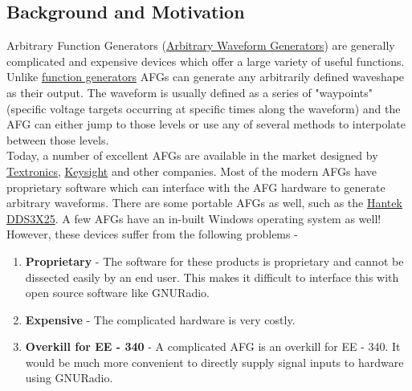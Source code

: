 \documentclass{article}
\begin{document}
\subsection{Background and Motivation}
Arbitrary Function Generators (\href{https://en.wikipedia.org/wiki/Arbitrary_waveform_generator}{Arbitrary Waveform Generators}) are generally complicated and expensive devices which offer a large variety of useful functions. Unlike \href{https://en.wikipedia.org/wiki/Function_generator}{function generators} AFGs can generate any arbitrarily defined waveshape as their output. The waveform is usually defined as a series of "waypoints" (specific voltage targets occurring at specific times along the waveform) and the AFG can either jump to those levels or use any of several methods to interpolate between those levels.
\\
Today, a number of excellent AFGs are available in the market designed by
\href{http://www.tek.com/arbitrary-function-generator}{Textronics}, \href{http://www.keysight.com/main/home.jspx?cc=IN&lc=eng}{Keysight} and other companies. Most of the modern AFGs have proprietary software which can interface with the AFG hardware to generate arbitrary waveforms. There are some portable AFGs as well, such as the \href{http://www.hantek.com/en/ProductDetail_12_24.html}{Hantek DDS3X25}. A few AFGs have an in-built Windows operating system as well!
\\However, these devices suffer from the following problems -
\begin{enumerate}
  \item \textbf{Proprietary} - The software for these products is proprietary and cannot be dissected easily by an end user. This makes it difficult to interface this with open source software like GNURadio.
  \item \textbf{Expensive} - The complicated hardware is very costly.
  \item \textbf{Overkill for EE - 340} - A complicated AFG is an overkill for EE - 340. It would be much more convenient to directly supply signal inputs to hardware using GNURadio.
\end{enumerate}
\end{document}
